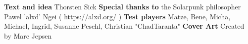 \newpage
\begin{center}
\textbf{Text and idea}
\newline
Thorsten Sick
\newline
\textbf{Special thanks to}
\newline
the Solarpunk philosopher Pawel 'alxd' Ngei ( https://alxd.org/ )
\newline
\textbf{Test players}
\newline
Matze, Bene, Micha, Michael, Ingrid, Susanne Peschl, Christian "ChadTaranta"
\newline
\textbf{Cover Art}
\newline
Created by Marc Jepsen
\newline
\end{center}
\newpage
